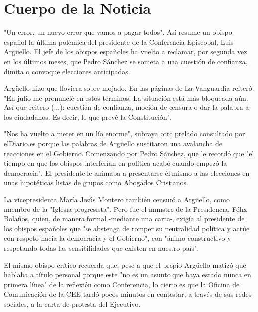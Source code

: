 \documentclass[10pt,a4paper]{article}
\begin{document}
\section*{Cuerpo de la Noticia}
\setlength{\parskip}{1em}
\setlength{\parindent}{0em}
"Un error, un nuevo error que vamos a pagar todos". As\'{i} resume un obispo espa\~{n}ol la \'{u}ltima pol\'{e}mica del presidente de la Conferencia Episcopal, Luis Arg\"{u}ello. El jefe de los obispos espa\~{n}oles ha vuelto a reclamar, por segunda vez en los \'{u}ltimos meses, que Pedro S\'{a}nchez se someta a una cuesti\'{o}n de confianza, dimita o convoque elecciones anticipadas.
\par\medskip
Arg\"{u}ello hizo que lloviera sobre mojado. En las p\'{a}ginas de La Vanguardia reiter\'{o}: "En julio me pronunci\'{e} en estos t\'{e}rminos. La situaci\'{o}n est\'{a} m\'{a}s bloqueada a\'{u}n. As\'{i} que reitero (...): cuesti\'{o}n de confianza, moci\'{o}n de censura o dar la palabra a los ciudadanos. Es decir, lo que prev\'{e} la Constituci\'{o}n".
\par\medskip
"Nos ha vuelto a meter en un l\'{i}o enorme", subraya otro prelado consultado por elDiario.es porque las palabras de Arg\"{u}ello suscitaron una avalancha de reacciones en el Gobierno. Comenzando por Pedro S\'{a}nchez, que le record\'{o} que "el tiempo en que los obispos interfer\'{i}an en pol\'{i}tica acab\'{o} cuando empez\'{o} la democracia". El presidente le animaba a presentarse \'{e}l mismo a las elecciones en unas hipot\'{e}ticas listas de grupos como Abogados Cristianos.
\par\medskip
La vicepresidenta Mar\'{i}a Jes\'{u}s Montero tambi\'{e}n censur\'{o} a Arg\"{u}ello, como miembro de la "Iglesia progresista". Pero fue el ministro de la Presidencia, F\'{e}lix Bola\~{n}os, quien, de manera formal -mediante una carta-, exig\'{i}a al presidente de los obispos espa\~{n}oles que "se abstenga de romper su neutralidad pol\'{i}tica y act\'{u}e con respeto hacia la democracia y el Gobierno", con "\'{a}nimo constructivo y respetando todas las sensibilidades que existen en nuestro pa\'{i}s".
\par\medskip
El mismo obispo cr\'{i}tico recuerda que, pese a que el propio Arg\"{u}ello matiz\'{o} que hablaba a t\'{i}tulo personal porque este "no es un asunto que haya estado nunca en primera l\'{i}nea" de la reflexi\'{o}n como Conferencia, lo cierto es que la Oficina de Comunicaci\'{o}n de la CEE tard\'{o} pocos minutos en contestar, a trav\'{e}s de sus redes sociales, a la carta de protesta del Ejecutivo.
\par\medskip
\end{document}
